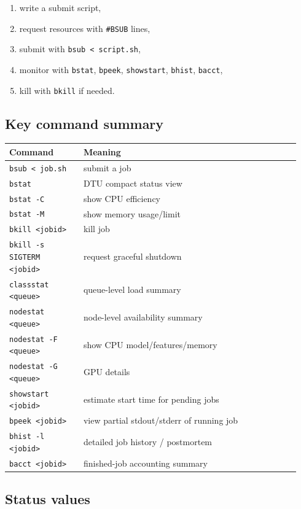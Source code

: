 \documentclass[11pt,a4paper]{article}
\begin{document}
\begin{enumerate}[leftmargin=1.5em]
  \item write a submit script,
  \item request resources with \texttt{\#BSUB} lines,
  \item submit with \texttt{bsub < script.sh},
  \item monitor with \texttt{bstat}, \texttt{bpeek}, \texttt{showstart}, \texttt{bhist}, \texttt{bacct},
  \item kill with \texttt{bkill} if needed.
\end{enumerate}

\subsection{Key command summary}

\begin{longtable}{p{0.24\linewidth} p{0.70\linewidth}}
\toprule
Command & Meaning \\
\midrule
\texttt{bsub < job.sh} & submit a job \\
\texttt{bstat} & DTU compact status view \\
\texttt{bstat -C} & show CPU efficiency \\
\texttt{bstat -M} & show memory usage/limit \\
\texttt{bkill <jobid>} & kill job \\
\texttt{bkill -s SIGTERM <jobid>} & request graceful shutdown \\
\texttt{classstat <queue>} & queue-level load summary \\
\texttt{nodestat <queue>} & node-level availability summary \\
\texttt{nodestat -F <queue>} & show CPU model/features/memory \\
\texttt{nodestat -G <queue>} & GPU details \\
\texttt{showstart <jobid>} & estimate start time for pending jobs \\
\texttt{bpeek <jobid>} & view partial stdout/stderr of running job \\
\texttt{bhist -l <jobid>} & detailed job history / postmortem \\
\texttt{bacct <jobid>} & finished-job accounting summary \\
\bottomrule
\end{longtable}

\subsection{Status values}
\end{document}
